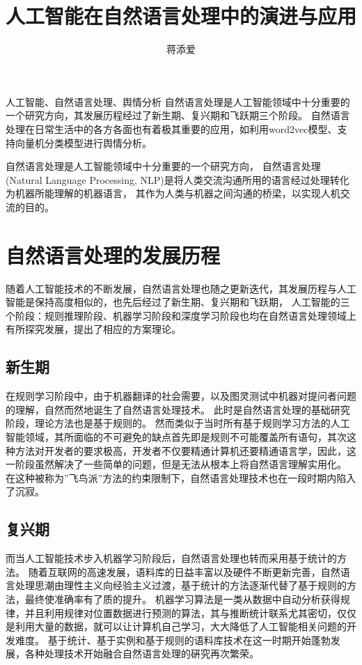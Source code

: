 \documentclass[]{SASSTeX}
\title{人工智能在自然语言处理中的演进与应用}
\author{蒋添爱}
\begin{document}
\MakeTitle[]

\begin{MakeAbstract}[]{人工智能、自然语言处理、舆情分析}
    自然语言处理是人工智能领域中十分重要的一个研究方向，其发展历程经过了新生期、复兴期和飞跃期三个阶段。
    自然语言处理在日常生活中的各方各面也有着极其重要的应用，如利用word2vec模型、支持向量机分类模型进行舆情分析。
\end{MakeAbstract}

自然语言处理是人工智能领域中十分重要的一个研究方向，
自然语言处理(Natural Language Processing, NLP)是将人类交流沟通所用的语言经过处理转化为机器所能理解的机器语言，
其作为人类与机器之间沟通的桥梁，以实现人机交流的目的。\cite{赵京胜2019自然语言处理发展及应用综述}

\section{自然语言处理的发展历程}

随着人工智能技术的不断发展，自然语言处理也随之更新迭代，其发展历程与人工智能是保持高度相似的，也先后经过了新生期、复兴期和飞跃期，
人工智能的三个阶段：规则推理阶段、机器学习阶段和深度学习阶段也均在自然语言处理领域上有所探究发展，提出了相应的方案理论。

\subsection{新生期}

在规则学习阶段中，由于机器翻译的社会需要，以及图灵测试中机器对提问者问题的理解，自然而然地诞生了自然语言处理技术。
此时是自然语言处理的基础研究阶段，理论方法也是基于规则的。
然而类似于当时所有基于规则学习方法的人工智能领域，其所面临的不可避免的缺点首先即是规则不可能覆盖所有语句，其次这种方法对开发者的要求极高，开发者不仅要精通计算机还要精通语言学，因此，这一阶段虽然解决了一些简单的问题，但是无法从根本上将自然语言理解实用化。
在这种被称为”飞鸟派”方法的约束限制下，自然语言处理技术也在一段时期内陷入了沉寂。

\subsection{复兴期}

而当人工智能技术步入机器学习阶段后，自然语言处理也转而采用基于统计的方法。
随着互联网的高速发展，语料库的日益丰富以及硬件不断更新完善，自然语言处理思潮由理性主义向经验主义过渡，基于统计的方法逐渐代替了基于规则的方法，最终使准确率有了质的提升。
机器学习算法是一类从数据中自动分析获得规律，并且利用规律对位置数据进行预测的算法，其与推断统计联系尤其密切，仅仅是利用大量的数据，就可以让计算机自己学习，大大降低了人工智能相关问题的开发难度\cite{李彦峰2018人工智能在自然语言处理中的应用}。
基于统计、基于实例和基于规则的语料库技术在这一时期开始蓬勃发展，各种处理技术开始融合自然语言处理的硏究再次繁荣。
\end{document}
